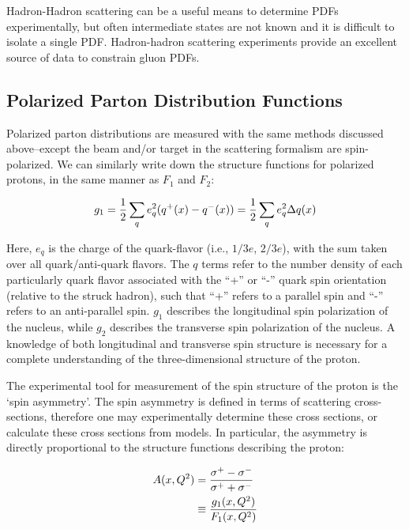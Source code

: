 Hadron-Hadron scattering can be a useful means to determine PDFs experimentally,
but often intermediate states are not known and it is difficult to isolate a
single PDF. Hadron-hadron scattering experiments provide an excellent source of
data to constrain gluon PDFs.

\subsection{Polarized Parton Distribution Functions}
\label{sec:polarized_parton_distribution_functions}

Polarized parton distributions are measured with the same methods discussed
above--except the beam and/or target in the scattering formalism are
spin-polarized. We can similarly write down the structure functions for
polarized protons, in the same manner as $F_1$ and $F_2$:

\begin{equation}
  g_1 = {1 \over 2}\sum_q e_q^2(q^+(x)-q^-(x)) 
  = {1 \over 2} \sum_q e^2_q\Delta q(x)
  \label{eq:g1}
\end{equation}

Here, $e_q$ is the charge of the quark-flavor (i.e., $1/3e$, $2/3e$), with the
sum taken over all quark/anti-quark flavors. The $q$ terms refer to the number
density of each particularly quark flavor associated with the ``+'' or ``-''
quark spin orientation (relative to the struck hadron), such that ``+'' refers
to a parallel spin and ``-'' refers to an anti-parallel spin. $g_1$ describes
the longitudinal spin polarization of the nucleus, while $g_2$ describes the
transverse spin polarization of the nucleus. A knowledge of both longitudinal
and transverse spin structure is necessary for a complete understanding of the
three-dimensional structure of the proton.

The experimental tool for measurement of the spin structure of the proton is the
`spin asymmetry'. The spin asymmetry is defined in terms of scattering
cross-sections, therefore one may experimentally determine these cross sections,
or calculate these cross sections from models. In particular, the asymmetry is
directly proportional to the structure functions describing the proton:

\begin{align}
  A(x,Q^2) &= 
  {{\sigma^+-\sigma^-}\over{\sigma^++\sigma^-}} \label{eq:al_simple} \\
           &\equiv 
  {{g_1(x,Q^2)}\over{F_1(x,Q^2)}} \label{eq:al_structure}
\end{align}

